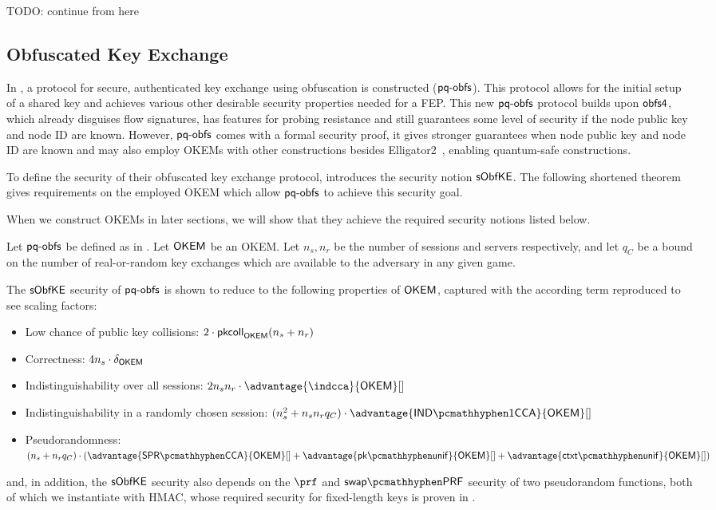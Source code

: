 TODO: continue from here

\subsection{Obfuscated Key Exchange}

In \cite{CCS:GunSteVei24}, a protocol for secure, authenticated key exchange using obfuscation is constructed ($\textsf{pq-obfs}$). This protocol allows for the initial setup of a shared key and achieves various other desirable security properties needed for a FEP.
This new $\textsf{pq-obfs}$ protocol builds upon $\textsf{obfs4}$, which already disguises flow signatures, has features for probing resistance and still guarantees some level of security if the node public key and node ID are known.
However, $\textsf{pq-obfs}$ comes with a formal security proof, it gives stronger guarantees when node public key and node ID are known and may also employ OKEMs with other constructions besides \textsf{Elligator2}~\cite{CCS:BHKL13}, enabling quantum-safe constructions.

To define the security of their obfuscated key exchange protocol, \cite{CCS:GunSteVei24} introduces the security notion $\mathsf{sObfKE}$. The following shortened theorem gives requirements on the employed OKEM which allow $\textsf{pq-obfs}$ to achieve this security goal.

When we construct OKEMs in later sections, we will show that they achieve the required security notions listed below.

\begin{theorem}\label{thm:s-obfuscated-keyex-security}
    Let $\textsf{pq-obfs}$ be defined as in \cite[Fig. 7]{CCS:GunSteVei24}. Let $\mathsf{OKEM}$ be an OKEM.
    Let $n_s, n_r$ be the number of sessions and servers respectively, and let $q_C$ be a bound on the number of real-or-random key exchanges which are available to the adversary in any given game.
    
    The $\mathsf{sObfKE}$ security of $\textsf{pq-obfs}$ is shown to reduce to the following properties of $\mathsf{OKEM}$, captured with the according term reproduced to see scaling factors:
    \begin{itemize}
        \item Low chance of public key collisions: $2 \cdot \mathsf{pkcoll}_{\mathsf{OKEM}}(n_s+n_r)$
        \item Correctness: $4n_s \cdot \delta_{\mathsf{OKEM}}$
        \item Indistinguishability over all sessions: $2 n_s n_r \cdot \advantage{\indcca}{\OKEM}[]$
        \item Indistinguishability in a randomly chosen session: $(n_s^2 + n_s n_r q_C) \cdot \advantage{\indonecca}{\OKEM}[]$
        \item Pseudorandomness: $(n_s + n_r q_C) \cdot (\advantage{\sprcca}{\OKEM}[] + \advantage{\pkunif}{\OKEM}[] + \advantage{\ctxtunif}{\OKEM}[])$
    \end{itemize}

    and, in addition, the $\mathsf{sObfKE}$ security also depends on the $\prf$ and $\swapprf$ security of two pseudorandom functions, both of which we instantiate with HMAC, whose required security for fixed-length keys is proven in \cite{C:BBGS23}.
\end{theorem}